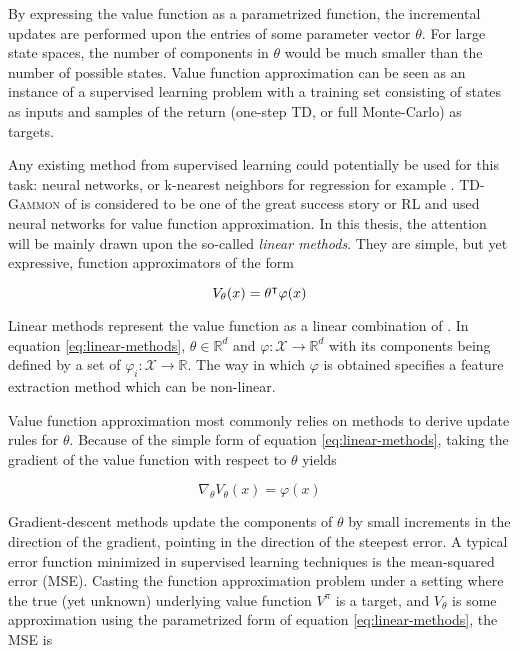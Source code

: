 By expressing the value function as a parametrized function, the incremental updates
are performed upon the entries of some parameter vector $\theta$. For
large state spaces, the number of components in $\theta$ would be much smaller than
the number of possible states. Value function
approximation can be seen as an instance of a supervised learning problem
with a training set consisting of states as inputs and samples of the return (one-step TD,
or full Monte-Carlo) as targets.

Any existing method from supervised learning could potentially be used for this task:
neural networks, or k-nearest neighbors for regression for example \parencite{Csaba2010}. \textsc{TD-Gammon} of \cite{Tesauro1995} is considered to be one of the great success story or RL and used neural networks for value function approximation. In this thesis, the attention
will be mainly drawn upon the so-called \textit{linear methods}. They are simple, but yet
expressive, function approximators of the form

\begin{equation}
V_{\theta}(x) = \theta^\intercal \varphi(x)
\label{eq:linear-methods}
\end{equation}

Linear methods represent the value function as a linear
combination of . In equation \ref{eq:linear-methods}, $\theta \in \mathbb{R}^d$ and $\varphi : \mathcal{X} \to \mathbb{R}^d$ with its components
being defined by a set of  $\varphi_i : \mathcal{X} \to
\mathbb{R}$. The way in which $\varphi$ is obtained specifies a feature extraction
method which can be non-linear.

Value function approximation most commonly relies on 
methods to derive update rules for $\theta$. Because of the simple form of equation \ref{eq:linear-methods}, taking the
gradient of the value function with respect to $\theta$ yields

\begin{equation}
\nabla_{\theta} V_\theta(x) = \varphi(x)
\label{eq:linear-gradient}
\end{equation}

Gradient-descent methods update the components of $\theta$ by small increments in the direction of
the gradient, pointing in the direction of the steepest error. A typical error function minimized in supervised
learning techniques is the mean-squared error (MSE). Casting the function
approximation problem under a setting where the true (yet unknown) underlying value
function $V^\pi$ is a target, and $V_\theta$ is some approximation using the
parametrized form of equation \ref{eq:linear-methods}, the MSE is 

